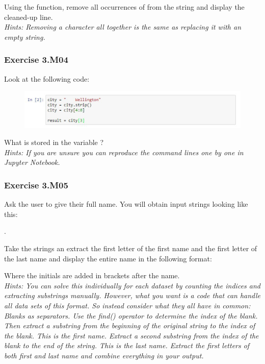 Using the {} function, remove all occurrences of {} from the string and display the cleaned-up line.\\


\textit{Hints:
Removing a character all together is the same as replacing it with an empty string.}\\[1cm]



\subsubsection*{Exercise 3.M04}
Look at the following code:
\begin{figure}[H]
		\centering
		\includegraphics[width=\textwidth]{../IMG/3M04.png} 
\end{figure}
What is stored in the variable {}?\\


\textit{Hints:
If you are unsure you can reproduce the command lines one by one in Jupyter Notebook.}\\[1cm]



\subsubsection*{Exercise 3.M05}

Ask the user to give their full name. You will obtain input strings looking like this: \begin{center}
	{}.
\end{center}
Take the strings an extract the first letter of the first name and the first letter of the last
name and display the entire name in the following format:
\begin{center}
	{}
\end{center}
Where the initials are added in brackets after the name.\\


\textit{Hints:
You can solve this individually for each dataset by counting the indices and extracting
substrings manually. However, what you want is a code that can handle all data sets of this
format. So instead consider what they all have in common: Blanks as separators.
Use the find() operator to determine the index of the blank. Then extract a substring from
the beginning of the original string to the index of the blank. This is the first name. Extract a
second substring from the index of the blank to the end of the string. This is the last name.
Extract the first letters of both first and last name and combine everything in your output.}\\[1cm]


